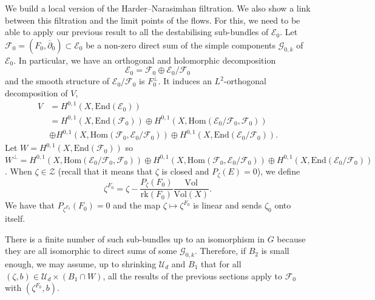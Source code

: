 \documentclass{article}
\theoremstyle{remark}
\theoremstyle{definition}
\newcommand{\rk}{\mathrm{rk}}
\newcommand{\Hom}{\mathrm{Hom}}
\newcommand{\End}{\mathrm{End}}
\newcommand{\Vol}{\mathrm{Vol}}
\newcommand{\E}{\mathcal{E}}
\newcommand{\F}{\mathcal{F}}
\newcommand{\G}{\mathcal{G}}
\newcommand{\mZ}{\mathcal{Z}}
\newcommand{\mU}{\mathcal{U}}
\newcommand{\dbar}{\overline{\partial}}
\begin{document}
We build a local version of the Harder--Narasimhan filtration. We also show a link between this filtration and the limit points of the flows. For this, we need to be able to apply our previous result to all the destabilising sub-bundles of $\E_0$. Let $\F_0 = (F_0,\dbar_0) \subset \E_0$ be a non-zero direct sum of the simple components $\G_{0,k}$ of $\E_0$. In particular, we have an orthogonal and holomorphic decomposition
$$
\E_0 = \F_0 \oplus \E_0/\F_0
$$
and the smooth structure of $\E_0/\F_0$ is $F_0^\bot$. It induces an $L^2$-orthogonal decomposition of $V$,
\begin{align*}
    V & = H^{0,1}(X,\End(\E_0))\\
    & = H^{0,1}(X,\End(\F_0)) \oplus H^{0,1}(X,\Hom(\E_0/\F_0,\F_0))\\
    & \oplus H^{0,1}(X,\Hom(\F_0,\E_0/\F_0)) \oplus H^{0,1}(X,\End(\E_0/\F_0)).
\end{align*}
Let $W = H^{0,1}(X,\End(\F_0))$ so $W^\bot = H^{0,1}(X,\Hom(\E_0/\F_0,\F_0)) \oplus H^{0,1}(X,\Hom(\F_0,\E_0/\F_0)) \oplus H^{0,1}(X,\End(\E_0/\F_0))$. When $\zeta \in \mZ$ (recall that it means that $\zeta$ is closed and $P_\zeta(E) = 0$), we define
$$
\zeta^{F_0} = \zeta - \frac{P_\zeta(F_0)}{\rk(F_0)}\frac{\Vol}{\Vol(X)}.
$$
We have that $P_{\zeta^{F_0}}(F_0) = 0$ and the map $\zeta \mapsto \zeta^{F_0}$ is linear and sends $\zeta_0$ onto itself.

There is a finite number of such sub-bundles up to an isomorphism in $G$ because they are all isomorphic to direct sums of some $\G_{0,k}$. Therefore, if $B_2$ is small enough, we may assume, up to shrinking $\mU_d$ and $B_1$ that for all $(\zeta,b) \in \mU_d \times (B_1 \cap W)$, all the results of the previous sections apply to $\F_0$ with $(\zeta^{F_0},b)$.
\end{document}
